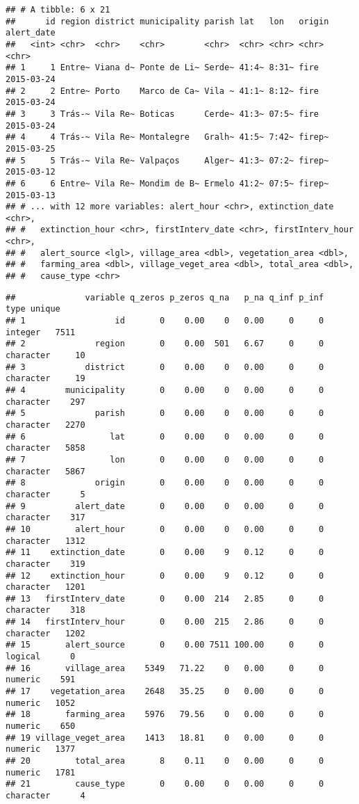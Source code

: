 \documentclass[
  12pt,
]{report}
\begin{document}
\begin{verbatim}
## # A tibble: 6 x 21
##      id region district municipality parish lat   lon   origin alert_date
##   <int> <chr>  <chr>    <chr>        <chr>  <chr> <chr> <chr>  <chr>     
## 1     1 Entre~ Viana d~ Ponte de Li~ Serde~ 41:4~ 8:31~ fire   2015-03-24
## 2     2 Entre~ Porto    Marco de Ca~ Vila ~ 41:1~ 8:12~ fire   2015-03-24
## 3     3 Trás-~ Vila Re~ Boticas      Cerde~ 41:3~ 07:5~ fire   2015-03-24
## 4     4 Trás-~ Vila Re~ Montalegre   Gralh~ 41:5~ 7:42~ firep~ 2015-03-25
## 5     5 Trás-~ Vila Re~ Valpaços     Alger~ 41:3~ 07:2~ firep~ 2015-03-12
## 6     6 Entre~ Vila Re~ Mondim de B~ Ermelo 41:2~ 07:5~ firep~ 2015-03-13
## # ... with 12 more variables: alert_hour <chr>, extinction_date <chr>,
## #   extinction_hour <chr>, firstInterv_date <chr>, firstInterv_hour <chr>,
## #   alert_source <lgl>, village_area <dbl>, vegetation_area <dbl>,
## #   farming_area <dbl>, village_veget_area <dbl>, total_area <dbl>,
## #   cause_type <chr>
\end{verbatim}

\begin{verbatim}
##              variable q_zeros p_zeros q_na   p_na q_inf p_inf      type unique
## 1                  id       0    0.00    0   0.00     0     0   integer   7511
## 2              region       0    0.00  501   6.67     0     0 character     10
## 3            district       0    0.00    0   0.00     0     0 character     19
## 4        municipality       0    0.00    0   0.00     0     0 character    297
## 5              parish       0    0.00    0   0.00     0     0 character   2270
## 6                 lat       0    0.00    0   0.00     0     0 character   5858
## 7                 lon       0    0.00    0   0.00     0     0 character   5867
## 8              origin       0    0.00    0   0.00     0     0 character      5
## 9          alert_date       0    0.00    0   0.00     0     0 character    317
## 10         alert_hour       0    0.00    0   0.00     0     0 character   1312
## 11    extinction_date       0    0.00    9   0.12     0     0 character    319
## 12    extinction_hour       0    0.00    9   0.12     0     0 character   1201
## 13   firstInterv_date       0    0.00  214   2.85     0     0 character    318
## 14   firstInterv_hour       0    0.00  215   2.86     0     0 character   1202
## 15       alert_source       0    0.00 7511 100.00     0     0   logical      0
## 16       village_area    5349   71.22    0   0.00     0     0   numeric    591
## 17    vegetation_area    2648   35.25    0   0.00     0     0   numeric   1052
## 18       farming_area    5976   79.56    0   0.00     0     0   numeric    650
## 19 village_veget_area    1413   18.81    0   0.00     0     0   numeric   1377
## 20         total_area       8    0.11    0   0.00     0     0   numeric   1781
## 21         cause_type       0    0.00    0   0.00     0     0 character      4
\end{verbatim}
\end{document}
